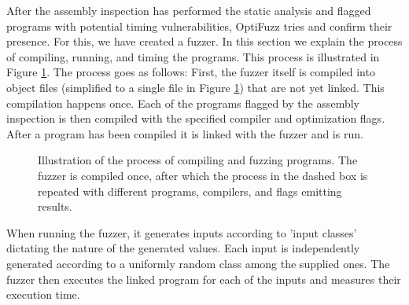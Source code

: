 After the assembly inspection has performed the static analysis and flagged programs with potential timing vulnerabilities, OptiFuzz tries and confirm their presence. 
For this, we have created a fuzzer.
In this section we explain the process of compiling, running, and timing the programs.
This process is illustrated in Figure \ref{fig:fuzzer-pipeline}.
The process goes as follows: 
First, the fuzzer itself is compiled into object files (simplified to a single file in Figure \ref{fig:fuzzer-pipeline}) that are not yet linked. 
This compilation happens once.
Each of the programs flagged by the assembly inspection is then compiled with the specified compiler and optimization flags.
After a program has been compiled it is linked with the fuzzer and is run.

\begin{figure}[H]
    \centering
    
    \caption{Illustration of the process of compiling and fuzzing programs. The fuzzer is compiled once, after which the process in the dashed box is repeated with different programs, compilers, and flags emitting results.}
    \label{fig:fuzzer-pipeline}
\end{figure}

When running the fuzzer, it generates inputs according to 'input classes' dictating the nature of the generated values.
Each input is independently generated according to a uniformly random class among the supplied ones.
The fuzzer then executes the linked program for each of the inputs and measures their execution time.

